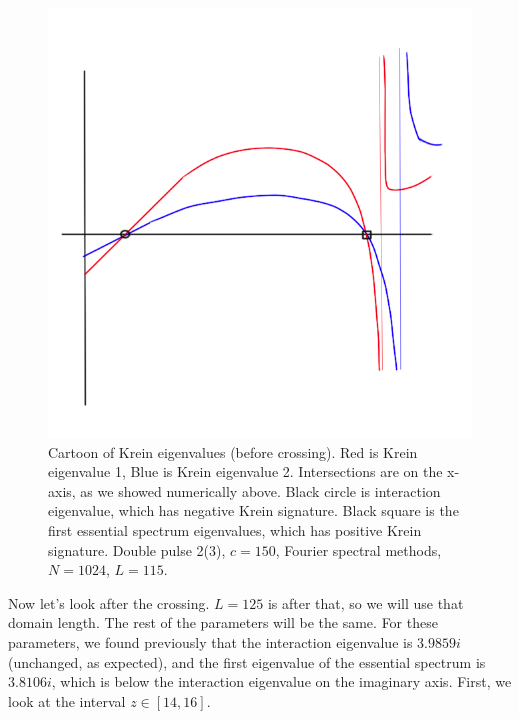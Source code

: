\documentclass[12pt]{article}
\begin{document}
\begin{figure}[H]
	\includegraphics[width=15cm]{kreincartoonbeforecrossing.png}
	\caption{Cartoon of Krein eigenvalues (before crossing). Red is Krein eigenvalue 1, Blue is Krein eigenvalue 2. Intersections are on the x-axis, as we showed numerically above. Black circle is interaction eigenvalue, which has negative Krein signature. Black square is the first essential spectrum eigenvalues, which has positive Krein signature. Double pulse 2(3), $c = 150$, Fourier spectral methods, $N = 1024$, $L = 115$.}
\end{figure}

Now let's look after the crossing. $L = 125$ is after that, so we will use that domain length. The rest of the parameters will be the same. For these parameters, we found previously that the interaction eigenvalue is $3.9859i$ (unchanged, as expected), and the first eigenvalue of the essential spectrum is $3.8106i$, which is below the interaction eigenvalue on the imaginary axis. First, we look at the interval $z \in [14, 16]$.
\end{document}
